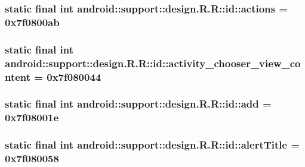 \hypertarget{classandroid_1_1support_1_1design_1_1_r_1_1id_6b3a247928dba7802d0c2b8601be293c}{
\subsubsection[{actions}]{\setlength{\rightskip}{0pt plus 5cm}static final int android::support::design.R.R::id::actions = 0x7f0800ab}}
\label{classandroid_1_1support_1_1design_1_1_r_1_1id_6b3a247928dba7802d0c2b8601be293c}


\hypertarget{classandroid_1_1support_1_1design_1_1_r_1_1id_81209b567f94737ff5c02ff81e3692db}{
\subsubsection[{activity\_\-chooser\_\-view\_\-content}]{\setlength{\rightskip}{0pt plus 5cm}static final int android::support::design.R.R::id::activity\_\-chooser\_\-view\_\-content = 0x7f080044}}
\label{classandroid_1_1support_1_1design_1_1_r_1_1id_81209b567f94737ff5c02ff81e3692db}


\hypertarget{classandroid_1_1support_1_1design_1_1_r_1_1id_075e03e15c92c444daa240ed945aacda}{
\subsubsection[{add}]{\setlength{\rightskip}{0pt plus 5cm}static final int android::support::design.R.R::id::add = 0x7f08001e}}
\label{classandroid_1_1support_1_1design_1_1_r_1_1id_075e03e15c92c444daa240ed945aacda}


\hypertarget{classandroid_1_1support_1_1design_1_1_r_1_1id_3267404a3eb61dd65ce9d1a5d6a54e7a}{
\subsubsection[{alertTitle}]{\setlength{\rightskip}{0pt plus 5cm}static final int android::support::design.R.R::id::alertTitle = 0x7f080058}}
\label{classandroid_1_1support_1_1design_1_1_r_1_1id_3267404a3eb61dd65ce9d1a5d6a54e7a}


